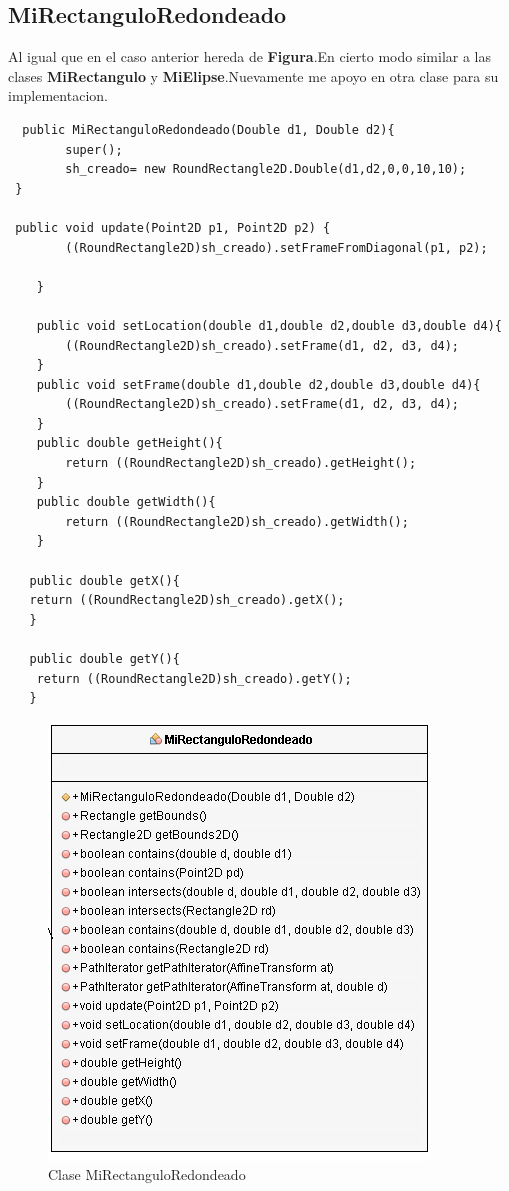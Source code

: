 \subsection{MiRectanguloRedondeado}
Al igual que en el caso anterior hereda de \textbf{Figura}.En cierto modo similar a las clases \textbf{MiRectangulo} y \textbf{MiElipse}.Nuevamente me apoyo en otra clase para su implementacion\cite{Rectangulored}.
\begin{lstlisting}
  public MiRectanguloRedondeado(Double d1, Double d2){
        super();
        sh_creado= new RoundRectangle2D.Double(d1,d2,0,0,10,10);
 }
 
 public void update(Point2D p1, Point2D p2) {
        ((RoundRectangle2D)sh_creado).setFrameFromDiagonal(p1, p2);
  
    }

    public void setLocation(double d1,double d2,double d3,double d4){
        ((RoundRectangle2D)sh_creado).setFrame(d1, d2, d3, d4);
    }
    public void setFrame(double d1,double d2,double d3,double d4){
        ((RoundRectangle2D)sh_creado).setFrame(d1, d2, d3, d4);
    }
    public double getHeight(){
        return ((RoundRectangle2D)sh_creado).getHeight();
    }
    public double getWidth(){
        return ((RoundRectangle2D)sh_creado).getWidth();
    }
 
   public double getX(){ 
   return ((RoundRectangle2D)sh_creado).getX();
   }

   public double getY(){ 
    return ((RoundRectangle2D)sh_creado).getY();
   }
\end{lstlisting}
\begin{figure}[H]
  \centering
    \includegraphics[scale=0.55]{images/mirectanguloredondeado2}
  \caption{Clase MiRectanguloRedondeado}
  \label{Clases MiRectanguloRedondeado}
\end{figure}
